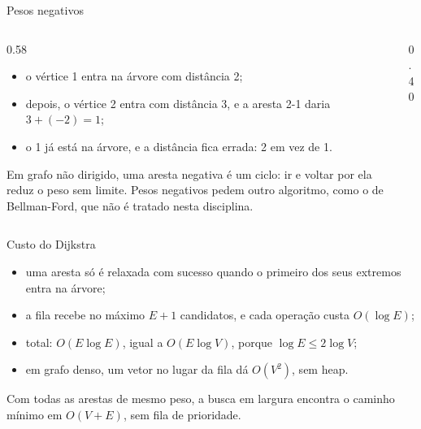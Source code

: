 \documentclass{beamer}
\begin{document}
\begin{frame}{Pesos negativos}
	\begin{columns}[c]
		\begin{column}{0.58\textwidth}
			\footnotesize
			\begin{itemize}
				\item o vértice 1 entra na árvore com distância 2;
				\item depois, o vértice 2 entra com distância 3, e a aresta 2-1 daria
				      $3 + (-2) = 1$;
				\item o 1 já está na árvore, e a distância fica errada: 2 em vez de 1.
			\end{itemize}
			\vspace{0.2cm}
			Em grafo não dirigido, uma aresta negativa é um ciclo: ir e voltar por
			ela reduz o peso sem limite. Pesos negativos pedem outro algoritmo, como
			o de Bellman-Ford, que não é tratado nesta disciplina.
		\end{column}
		\begin{column}{0.40\textwidth}
			\begin{center}
				\scalebox{1.1}{\pesoNegativo}
			\end{center}
		\end{column}
	\end{columns}
\end{frame}

\begin{frame}{Custo do Dijkstra}
	\begin{itemize}
		\item uma aresta só é relaxada com sucesso quando o primeiro dos seus
		      extremos entra na árvore;
		\item a fila recebe no máximo $E + 1$ candidatos, e cada operação custa
		      $O(\log E)$;
		\item total: $O(E \log E)$, igual a $O(E \log V)$, porque $\log E \le 2 \log
			      V$;
		\item em grafo denso, um vetor no lugar da fila dá $O(V^2)$, sem heap.
	\end{itemize}
	\vspace{0.3cm}
	\footnotesize
	Com todas as arestas de mesmo peso, a busca em largura encontra o caminho
	mínimo em $O(V + E)$, sem fila de prioridade.
\end{frame}
\end{document}
